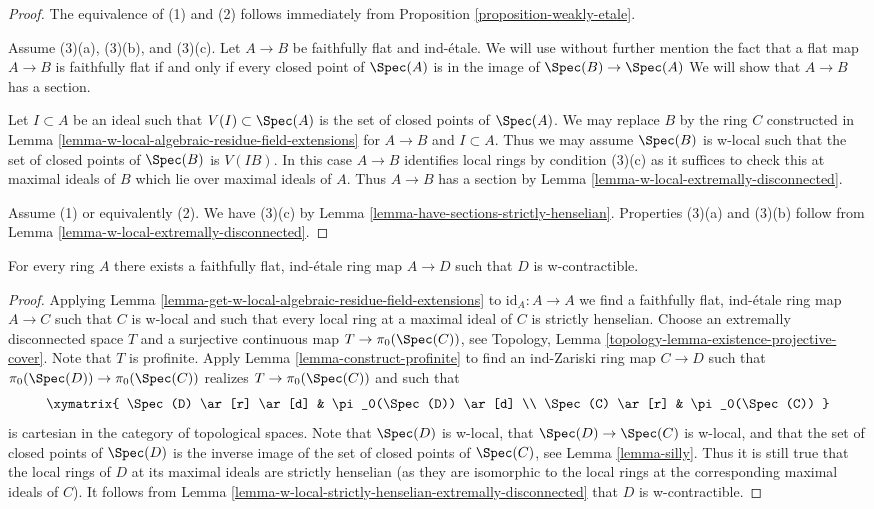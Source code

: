 \begin{proof}
The equivalence of (1) and (2) follows immediately from
Proposition \ref{proposition-weakly-etale}.

\medskip\noindent
Assume (3)(a), (3)(b), and (3)(c). Let $A \to B$ be faithfully flat
and ind-\'etale. We will use without further mention the fact that a flat map
$A \to B$ is faithfully flat if and only if every closed point
of $\Spec(A)$ is in the image of $\Spec(B) \to \Spec(A)$
We will show that $A \to B$ has a section.

\medskip\noindent
Let $I \subset A$ be an ideal such that $V(I) \subset \Spec(A)$ is
the set of closed points of $\Spec(A)$. 
We may replace $B$ by the ring $C$ constructed in
Lemma \ref{lemma-w-local-algebraic-residue-field-extensions}
for $A \to B$ and $I \subset A$.
Thus we may assume $\Spec(B)$ is w-local such that the set of
closed points of $\Spec(B)$ is $V(IB)$. In this case $A \to B$
identifies local rings by condition (3)(c) as it suffices to check
this at maximal ideals of $B$ which lie over maximal ideals of $A$.
Thus $A \to B$ has a section by
Lemma \ref{lemma-w-local-extremally-disconnected}.

\medskip\noindent
Assume (1) or equivalently (2). We have (3)(c) by
Lemma \ref{lemma-have-sections-strictly-henselian}.
Properties (3)(a) and (3)(b) follow from
Lemma \ref{lemma-w-local-extremally-disconnected}.
\end{proof}

\begin{proposition}
\label{proposition-find-w-contractible}
For every ring $A$ there exists a faithfully flat, ind-\'etale ring
map $A \to D$ such that $D$ is w-contractible.
\end{proposition}

\begin{proof}
Applying Lemma \ref{lemma-get-w-local-algebraic-residue-field-extensions}
to $\text{id}_A : A \to A$ we find a faithfully flat, ind-\'etale ring map
$A \to C$ such that $C$ is w-local and such that every local ring at a
maximal ideal of $C$ is strictly henselian.
Choose an extremally disconnected space $T$ and a surjective
continuous map $T \to \pi_0(\Spec(C))$, see
Topology, Lemma \ref{topology-lemma-existence-projective-cover}.
Note that $T$ is profinite. Apply Lemma \ref{lemma-construct-profinite}
to find an ind-Zariski ring map $C \to D$ such that
$\pi_0(\Spec(D)) \to \pi_0(\Spec(C))$ realizes $T \to \pi_0(\Spec(C))$
and such that
$$
\xymatrix{
\Spec(D) \ar[r] \ar[d] & \pi_0(\Spec(D)) \ar[d] \\
\Spec(C) \ar[r] & \pi_0(\Spec(C))
}
$$
is cartesian in the category of topological spaces. Note that $\Spec(D)$
is w-local, that $\Spec(D) \to \Spec(C)$ is w-local, and that the
set of closed points of $\Spec(D)$ is the inverse image of the
set of closed points of $\Spec(C)$, see Lemma \ref{lemma-silly}.
Thus it is still true that the local rings of $D$ at its maximal
ideals are strictly henselian (as they are isomorphic to the
local rings at the corresponding maximal ideals of $C$).
It follows from
Lemma \ref{lemma-w-local-strictly-henselian-extremally-disconnected}
that $D$ is w-contractible.
\end{proof}

